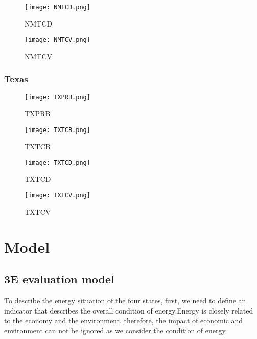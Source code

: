 \documentclass{mcmthesis}
\begin{document}
\begin{figure}[H]
\begin{minipage}[htb]{0.5\textwidth}
\centering
\texttt{[image: NMTCD.png]}
\caption{NMTCD} \label{fig:NMTCD}
\end{minipage}
\begin{minipage}[htb]{0.5\textwidth}
\centering
\texttt{[image: NMTCV.png]}
\caption{NMTCV} \label{fig:NMTCV}
\end{minipage}
\end{figure}

\subsubsection{Texas}
\begin{figure}[H]
\begin{minipage}[htb]{0.5\textwidth}
\centering
\texttt{[image: TXPRB.png]}
\caption{TXPRB} \label{fig:TXPRB}
\end{minipage}
\begin{minipage}[htb]{0.5\textwidth}
\centering
\texttt{[image: TXTCB.png]}
\caption{TXTCB} \label{fig:TXTCB}
\end{minipage}
\end{figure}

\begin{figure}[H]
\begin{minipage}[htb]{0.5\textwidth}
\centering
\texttt{[image: TXTCD.png]}
\caption{TXTCD} \label{fig:TXTCD}
\end{minipage}
\begin{minipage}[htb]{0.5\textwidth}
\centering
\texttt{[image: TXTCV.png]}
\caption{TXTCV} \label{fig:TXTCV}
\end{minipage}
\end{figure}


\section{Model}
\subsection{3E evaluation model}
To describe the energy situation of the four states, first, we need to define an indicator that describes the overall condition of energy.Energy is closely related to the economy and the environment. therefore, the impact of economic and environment can not be ignored as we consider the condition of energy.
\end{document}
